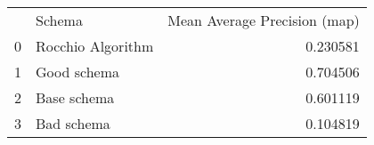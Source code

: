 \begin{tabular}{llr}
 & Schema & Mean Average Precision (map) \\
0 & Rocchio Algorithm & 0.230581 \\
1 & Good schema & 0.704506 \\
2 & Base schema & 0.601119 \\
3 & Bad schema & 0.104819 \\
\end{tabular}
